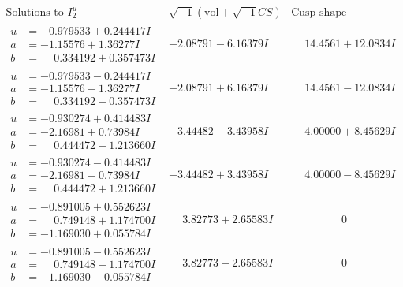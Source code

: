 \documentclass[1p]{elsarticle_modified}
\theoremstyle{definition}
\newcommand{\I}{\sqrt{-1}}
\begin{document}
$$\begin{array}{c|c|c}  
\text{Solutions to }I^u_{2}& \I (\text{vol} + \sqrt{-1}CS) & \text{Cusp shape}\\
 \hline 
\begin{aligned}
u &= -0.979533 + 0.244417 I \\
a &= -1.15576 + 1.36277 I \\
b &= \phantom{-}0.334192 + 0.357473 I\end{aligned}
 & -2.08791 - 6.16379 I & \phantom{-}14.4561 + 12.0834 I \\ \hline\begin{aligned}
u &= -0.979533 - 0.244417 I \\
a &= -1.15576 - 1.36277 I \\
b &= \phantom{-}0.334192 - 0.357473 I\end{aligned}
 & -2.08791 + 6.16379 I & \phantom{-}14.4561 - 12.0834 I \\ \hline\begin{aligned}
u &= -0.930274 + 0.414483 I \\
a &= -2.16981 + 0.73984 I \\
b &= \phantom{-}0.444472 - 1.213660 I\end{aligned}
 & -3.44482 - 3.43958 I & \phantom{-}4.00000 + 8.45629 I \\ \hline\begin{aligned}
u &= -0.930274 - 0.414483 I \\
a &= -2.16981 - 0.73984 I \\
b &= \phantom{-}0.444472 + 1.213660 I\end{aligned}
 & -3.44482 + 3.43958 I & \phantom{-}4.00000 - 8.45629 I \\ \hline\begin{aligned}
u &= -0.891005 + 0.552623 I \\
a &= \phantom{-}0.749148 + 1.174700 I \\
b &= -1.169030 + 0.055784 I\end{aligned}
 & \phantom{-}3.82773 + 2.65583 I & \phantom{-0.000000 } 0 \\ \hline\begin{aligned}
u &= -0.891005 - 0.552623 I \\
a &= \phantom{-}0.749148 - 1.174700 I \\
b &= -1.169030 - 0.055784 I\end{aligned}
 & \phantom{-}3.82773 - 2.65583 I & \phantom{-0.000000 } 0 \\ \hline\begin{aligned}

\end{aligned}
\end{array}$$
\end{document}
